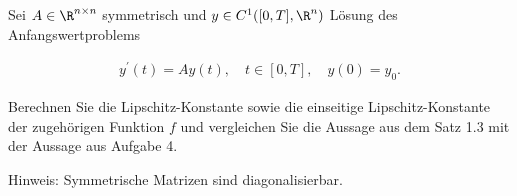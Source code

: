 \begin{exercise}

Sei $A \in \R^{n \times n}$ symmetrisch und $y \in C^1([0, T], \R^n)$ Lösung des Anfangswertproblems

\begin{align*}
  y^\prime(t) = A y(t),
  \quad
  t \in [0, T],
  \quad
  y(0) = y_0.
\end{align*}

Berechnen Sie die Lipschitz-Konstante sowie die einseitige Lipschitz-Konstante der zugehörigen Funktion $f$ und vergleichen Sie die Aussage aus dem Satz 1.3 mit der Aussage aus Aufgabe 4.

Hinweis: Symmetrische Matrizen sind diagonalisierbar.

\end{exercise}

\begin{solution}

\end{solution}

